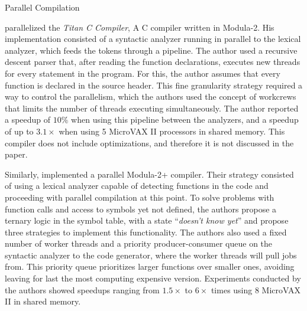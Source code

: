 \begin{section}{Parallel Compilation}

 \cite{vandevoorde1988parallel} parallelized the \textit{Titan C Compiler}, A C
 compiler written in Modula-2. His implementation consisted of a syntactic
 analyzer running in parallel to the lexical analyzer, which feeds the tokens
 through a pipeline. The author used a recursive descent parser that, after
 reading the function declarations, executes new threads for every statement in
 the program. For this, the author assumes that every function is declared in
 the source header. This fine granularity strategy required a way to control
 the parallelism, which the authors used the concept of workcrews that limits
 the number of threads executing simultaneously. The author reported a speedup
 of $10\%$ when using this pipeline between the analyzers, and a speedup of up
 to $3.1\times$ when using 5 MicroVAX II processors in shared memory. This
 compiler does not include optimizations, and therefore it is not discussed in
 the paper.



Similarly, \cite{wortman1992} implemented a parallel Modula-2+ compiler. Their
strategy consisted of using a lexical analyzer capable of detecting functions
in the code and proceeding with parallel compilation at this point. To solve
problems with function calls and access to symbols yet not defined, the authors
propose a ternary logic in the symbol table, with a state ``\textit{doesn't
know yet}'' and propose three strategies to implement this functionality. The
authors also used a fixed number of worker threads and a priority
producer-consumer queue on the syntactic analyzer to the code generator, where
the worker threads will pull jobs from. This priority queue prioritizes larger
functions over smaller ones, avoiding leaving for last the most computing
expensive version. Experiments conducted by the authors showed speedups ranging
from $1.5\times$ to $6\times$ times using 8 MicroVAX II in shared memory.


\end{section}
